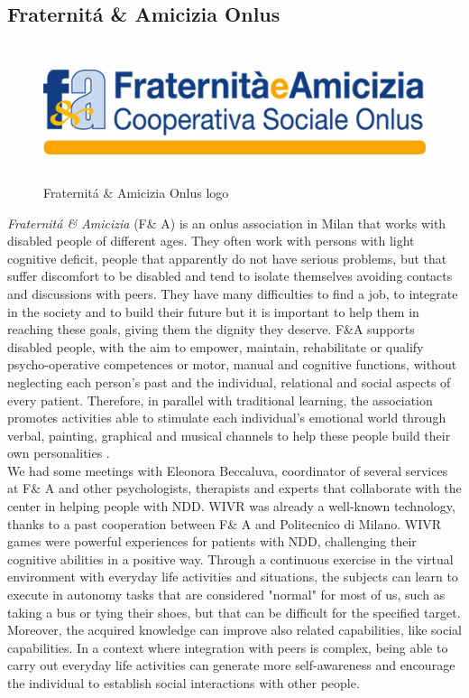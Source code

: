 \subsection{Fraternit\'a \& Amicizia Onlus}
\begin{figure}[H]
\centering
\includegraphics[width=12cm, height=4cm]{immagini/logofa.jpg}
\caption{Fraternit\'a \& Amicizia Onlus logo}\label{fig:logofa}
\end{figure}
\textit{Fraternit\'a \& Amicizia} (F\& A) is an onlus association in Milan that works with disabled people of different ages. They often work with persons with light cognitive deficit, people that apparently do not have serious problems, but that suffer discomfort to be disabled and tend to isolate themselves avoiding contacts and discussions with peers. They have many difficulties to find a job, to integrate in the society and to build their future but it is important to help them in reaching these goals, giving them the dignity they deserve. F\&A  supports disabled people, with the aim to empower, maintain, rehabilitate or qualify psycho-operative competences or motor, manual and cognitive functions, without neglecting each person's past and the individual, relational and social aspects of every patient. Therefore, in parallel with traditional learning, the association promotes activities able to stimulate each individual's emotional world through verbal, painting, graphical and musical channels to help these people build their own personalities \cite{Amicizia}.\\
We had some meetings with Eleonora Beccaluva, coordinator of several services at F\& A and other psychologists, therapists and experts that collaborate with the center in helping people with NDD. WIVR
was already a well-known technology, thanks to a past cooperation between F\& A and Politecnico di Milano. WIVR games were powerful experiences for patients with NDD, challenging their cognitive abilities in a positive way. Through a continuous exercise in the virtual environment with everyday life activities and situations, the subjects can learn to execute in autonomy tasks that are considered "normal" for most of us, such as taking a bus or tying their shoes, but that can be difficult for the specified target. Moreover, the acquired knowledge can improve also related capabilities, like social capabilities. In a context where integration with peers is complex, being able to carry out everyday life activities can generate more self-awareness and encourage the individual to establish social interactions with other people.


